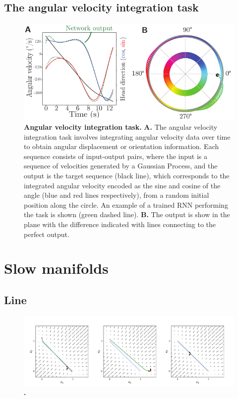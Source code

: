 \documentclass{article}
\newcounter{ct}
\theoremstyle{definition}
\theoremstyle{remark}
\begin{document}
\subsection{The angular velocity integration task}
\begin{figure}[H]
    \centering
    \includegraphics[width=\textwidth]{figures/angular_task.pdf}
    \caption{\textbf{Angular velocity integration task.}
    \textbf{A.} The angular velocity integration task involves integrating angular velocity data over time to obtain angular displacement or orientation information.
    Each sequence consists of input-output pairs, where the input is a sequence of velocities generated by a Gaussian Process, and the output is the target sequence (black line), which corresponds to the integrated angular velocity encoded as the sine and cosine of the angle (blue and red lines respectively), from a random initial position along the circle.
    An example of a trained RNN performing the task is shown (green dashed line).
    \textbf{B.} The output is show in the plane with the difference indicated with lines connecting to the perfect output.
    }
    \label{fig:angular_task}
\end{figure}


\newpage
\section{Slow manifolds}
\subsection{Line}
\begin{figure}[H]
    \centering
    \includegraphics[width=\textwidth]{figures/bla_slowmanifolds.pdf}
    \caption{\textbf{.}}
    \label{fig:}
\end{figure}
\end{document}
